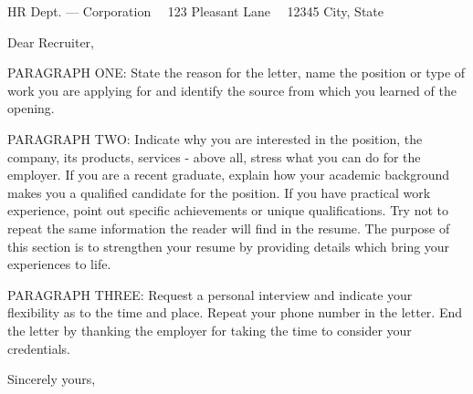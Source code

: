 \documentclass{scrlttr2}
\renewcommand{\\}{\ {\large\textperiodcentered}\ }
\begin{document}

\begin{letter}{ %
HR Dept. --- Corporation\\
123 Pleasant Lane\\
12345 City, State
}


\opening{Dear Recruiter,}

PARAGRAPH ONE: State the reason for the letter, name the position or type of work you are applying for and identify the source from which you learned of the opening.\\

PARAGRAPH TWO: Indicate why you are interested in the position, the company, its products, services - above all, stress what you can do for the employer. If you are a recent graduate, explain how your academic background makes you a qualified candidate for the position. If you have practical work experience, point out specific achievements or unique qualifications. Try not to repeat the same information the reader will find in the resume. The purpose of this section is to strengthen your resume by providing details which bring your experiences to life.\\

PARAGRAPH THREE: Request a personal interview and indicate your flexibility as to the time and place. Repeat your phone number in the letter. End the letter by thanking the employer for taking the time to consider your credentials.\\

Sincerely yours, \\ \\ \\


\end{letter}
\end{document}
